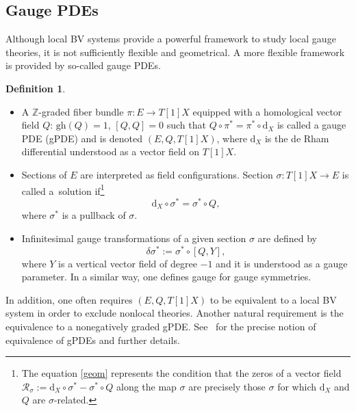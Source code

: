 \documentclass[10pt,a4paper]{amsart}
\numberwithin{equation}{section}
\theoremstyle{definition}
\newtheorem{Definition}[Theorem]{Definition}
\newcommand{\gh}[1]{\mathrm{gh}(#1)}
\newcommand{\dx}{\mathrm{d}_X}
\begin{document}
\subsection{Gauge PDEs}
Although local BV systems provide a powerful framework to study local gauge theories, it is not sufficiently flexible and geometrical. A more flexible framework is provided by so-called gauge PDEs.

\begin{Definition}\quad
\begin{itemize}\itemsep=0pt
 \item A $\mathbb{Z}$-graded fiber bundle $\pi\colon E \rightarrow T[1]X$ equipped with a homological vector field $Q$: $\gh{Q} =1$, $[Q,Q]=0$ such that $Q\circ\pi^* = \pi^*\circ \dx$ is called a gauge PDE (gPDE) and is denoted $(E,Q,T[1]X)$, where $\dx$ is the de Rham differential understood as a vector field on $T[1]X$.
 \item Sections of $E$ are interpreted as field configurations. Section $\sigma\colon T[1]X\rightarrow E$ is called a~solution if\footnote{The equation \eqref{geom} represents the condition that the zeros of a vector field $\mathcal{R}_\sigma:=\dx\circ \sigma^* - \sigma^* \circ Q$ along the map $\sigma$ are precisely those $\sigma$ for which $\dx$ and $Q$ are $\sigma$-related.}
 \begin{equation}\label{geom}
 \dx\circ \sigma^*=\sigma^*\circ Q,
 \end{equation}
 where $\sigma^*$ is a pullback of $\sigma$.
 \item Infinitesimal gauge transformations of a given section $\sigma$ are defined by
 \begin{equation}\label{gt}
 \delta\sigma^*:=\sigma^*\circ [Q,Y],
 \end{equation}
 where $Y$ is a vertical vector field of degree $-1$ and it is understood as a gauge parameter. In a similar way, one defines gauge for gauge symmetries.
\end{itemize}
\end{Definition}
In addition, one often requires $(E,Q,T[1]X)$ to be equivalent to a local BV system in order to exclude nonlocal theories. Another natural requirement is the equivalence to a nonegatively graded gPDE. See~\cite{Grigoriev:2019ojp} for the precise notion of equivalence of gPDEs and further details.
\end{document}
